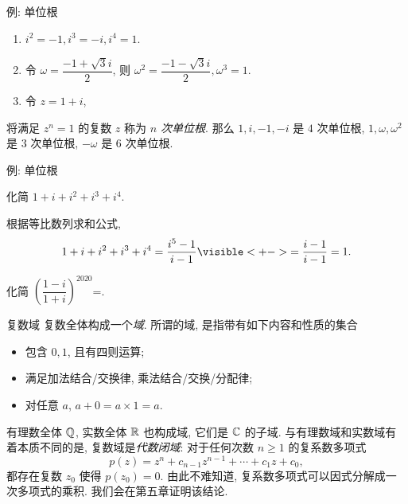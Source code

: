 \begin{frame}{例: 单位根}
	\onslide<+->
	\begin{example}
		\begin{enumerate}
			\item $i^2=-1,i^3=-i,i^4=1$.
			\onslide<+->{%
				一般地, 对于整数 $n$, 
				\[i^{4n}=1,\quad i^{4n+1}=i,\quad i^{4n+2}=-1,\quad i^{4n+3}=-i.\]
			}
			\vspace{-\baselineskip}
			\item 令 $\omega=\dfrac{-1+\sqrt 3i}2$, 则 $\omega^2=\dfrac{-1-\sqrt3i}2,\omega^3=1$.
			\item 令 $z=1+i$, \onslide<+->{则
			\[z^2=2i,\quad z^3=-2+2i,\quad z^4=-4,\quad z^8=16=2^4.\]}
		\end{enumerate}
		\vspace{-\baselineskip}
	\end{example}
	\onslide<+->
	将满足 $z^n=1$ 的复数 $z$ 称为 \emph{$n$ 次单位根}.
	\onslide<+->
	那么 $1,i,-1,-i$ 是 $4$ 次单位根, $1,\omega,\omega^2$ 是 $3$ 次单位根, $-\omega$ 是 $6$ 次单位根.
\end{frame}


\begin{frame}{例: 单位根}
	\onslide<+->
	\begin{example}
		化简 $1+i+i^2+i^3+i^4$.
	\end{example}
	\onslide<+->
	\begin{solution}
		根据等比数列求和公式,
		\[1+i+i^2+i^3+i^4=\frac{i^5-1}{i-1}
		\visible<+->{=\frac{i-1}{i-1}=1.}\]
	\end{solution}
	\onslide<+->
	\begin{exercise}
		化简 $\left(\dfrac{1-i}{1+i}\right)^{2020}$=\fillblank{\visible<+->{$1$}}.
	\end{exercise}
\end{frame}


\begin{frame}{复数域\noexer}
	\onslide<+->
	复数全体构成一个\emph{域}.
	\onslide<+->
	所谓的域, 是指带有如下内容和性质的集合
	\begin{itemize}
		\item 包含 $0,1$, 且有四则运算;
		\item 满足加法结合/交换律, 乘法结合/交换/分配律;
		\item 对任意 $a$, $a+0=a\times 1=a$.
	\end{itemize}
	\onslide<+->
	有理数全体 ${\mathbb{Q}}$, 实数全体 ${\mathbb{R}}$ 也构成域, 它们是 ${\mathbb{C}}$ 的子域.
	\onslide<+->
	与有理数域和实数域有着本质不同的是, 复数域是\emph{代数闭域}:
	\onslide<+->
	对于任何次数 $n\ge 1$ 的复系数多项式
		\[p(z)=z^n+c_{n-1}z^{n-1}+\cdots+c_1z+c_0,\]
	都存在复数 $z_0$ 使得 $p(z_0)=0$.
	\onslide<+->
	由此不难知道, 复系数多项式可以因式分解成一次多项式的乘积.
	\onslide<+->
	我们会在第五章证明该结论.
\end{frame}


